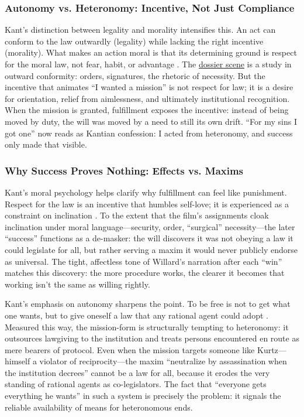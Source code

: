 \subsubsection*{Autonomy vs. Heteronomy: Incentive, Not Just Compliance}

Kant's distinction between legality and morality intensifies this. An act can conform to the
law outwardly (legality) while lacking the right incentive (morality). What makes an action
moral is that its determining ground is respect for the moral law, not fear, habit, or advantage
\parencite[pp.~72--76]{KantCPrR1996}. The \hyperref[scene:briefing]{dossier scene} is a study
in outward conformity: orders, signatures, the rhetoric of necessity. But the incentive that
animates ``I wanted a mission'' is not respect for law; it is a desire for orientation, relief
from aimlessness,
and ultimately institutional recognition. When the mission is granted, fulfillment exposes
the incentive: instead of being moved by duty, the will was moved by a need to still its own
drift. ``For my sins I got one'' now reads as Kantian confession: I acted from heteronomy,
and success only made that visible.

\subsubsection*{Why Success Proves Nothing: Effects vs. Maxims}

Kant's moral psychology helps clarify why fulfillment can feel like punishment. Respect for
the law is an incentive that humbles self-love; it is experienced as a constraint on inclination
\parencite[pp.~70--73]{KantCPrR1996}. To the extent that the film's assignments cloak
inclination under moral language—security, order, ``surgical'' necessity—the later ``success''
functions as a de-masker: the will discovers it was not obeying a law it could legislate for
all, but rather serving a maxim it would never publicly endorse as universal. The tight,
affectless tone of Willard's narration after each ``win'' matches this discovery: the more
procedure works, the clearer it becomes that working isn't the same as willing rightly.

Kant's emphasis on autonomy sharpens the point. To be free is not to get what one wants, but
to give oneself a law that any rational agent could adopt \parencite[pp.~30--33]{KantCPrR1996}.
Measured this way, the mission-form is structurally tempting to heteronomy: it outsources
lawgiving to the institution and treats persons encountered en route as mere bearers of protocol.
Even when the mission targets someone like Kurtz—himself a violator of reciprocity—the maxim
``neutralize by assassination when the institution decrees'' cannot be a law for all, because
it erodes the very standing of rational agents as co-legislators. The fact that ``everyone gets
everything he wants'' in such a system is precisely the problem: it signals the reliable
availability of means for heteronomous ends.

